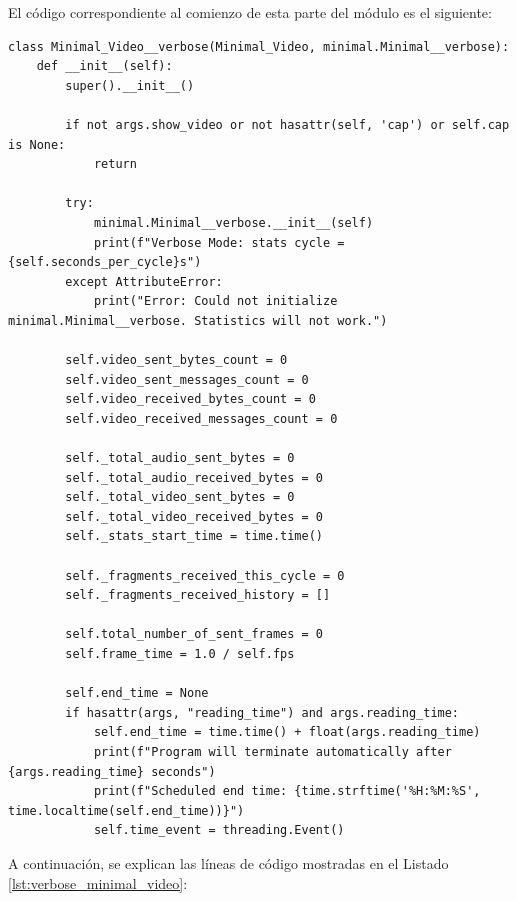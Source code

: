 El código correspondiente al comienzo de esta parte del módulo es el siguiente:

\begin{lstlisting}[style=pythonstyle, caption={Código de la inicialización de \textit{Minimal\_Video\_verbose}.}, label={lst:verbose_minimal_video}]
class Minimal_Video__verbose(Minimal_Video, minimal.Minimal__verbose):
    def __init__(self):
        super().__init__()

        if not args.show_video or not hasattr(self, 'cap') or self.cap is None:
            return

        try:
            minimal.Minimal__verbose.__init__(self)
            print(f"Verbose Mode: stats cycle = {self.seconds_per_cycle}s")
        except AttributeError:
            print("Error: Could not initialize minimal.Minimal__verbose. Statistics will not work.")

        self.video_sent_bytes_count = 0
        self.video_sent_messages_count = 0
        self.video_received_bytes_count = 0
        self.video_received_messages_count = 0

        self._total_audio_sent_bytes = 0
        self._total_audio_received_bytes = 0
        self._total_video_sent_bytes = 0
        self._total_video_received_bytes = 0
        self._stats_start_time = time.time()

        self._fragments_received_this_cycle = 0
        self._fragments_received_history = []

        self.total_number_of_sent_frames = 0
        self.frame_time = 1.0 / self.fps

        self.end_time = None
        if hasattr(args, "reading_time") and args.reading_time:
            self.end_time = time.time() + float(args.reading_time)
            print(f"Program will terminate automatically after {args.reading_time} seconds")
            print(f"Scheduled end time: {time.strftime('%H:%M:%S', time.localtime(self.end_time))}")
            self.time_event = threading.Event()
\end{lstlisting}
\vspace{\baselineskip}

A continuación, se explican las líneas de código mostradas en el Listado \ref{lst:verbose_minimal_video}:

